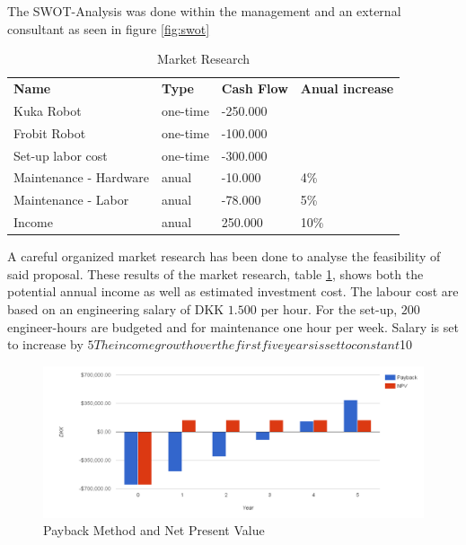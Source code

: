 The SWOT-Analysis was done within the management and an external consultant as seen in figure \ref{fig:swot}
\begin{table}[]
\centering
\begin{tabular}{llll}
\textbf{Name}          & \textbf{Type} & \textbf{Cash Flow} & \textbf{Anual increase} \\
Kuka Robot             & one-time      & -250.000           &                         \\
Frobit Robot           & one-time      & -100.000           &                         \\
Set-up labor cost      & one-time      & -300.000           &                         \\
Maintenance - Hardware & anual         & -10.000            & 4\%                     \\
Maintenance - Labor    & anual         & -78.000            & 5\%                     \\
Income                 & anual         & 250.000            & 10\%                   
\end{tabular}
\caption{Market Research}
\label{tab:market_research}
\end{table}
A careful organized market research has been done to analyse the feasibility of said proposal. These results of the market research, table \ref{tab:market_research}, shows both the potential annual income as well as estimated investment cost.
The labour cost are based on an engineering salary of DKK $1.500$ per hour. For the set-up, $200$ engineer-hours are budgeted and for maintenance one hour per week. Salary is set to increase by $5%
The income growth over the first five years is set to constant $10%
    \begin{figure}[h]
        \centering
        \includegraphics[width=1.0\textwidth]{figs/pb_npv}
        \caption{Payback Method and Net Present Value}
        \label{fig:payback_npv}
    \end{figure}

